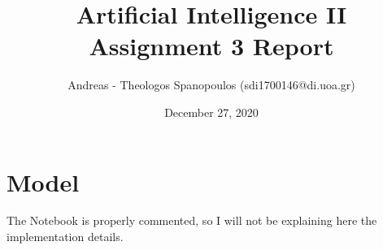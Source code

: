 \documentclass[12pt]{report}
\title{Artificial Intelligence II \\ Assignment 3 Report}
\author{Andreas - Theologos Spanopoulos (sdi1700146@di.uoa.gr)}
\date{December 27, 2020}
\begin{document}
\maketitle

\section*{Model}
The Notebook is properly commented, so I will not be explaining here the implementation details. 
\end{document}
